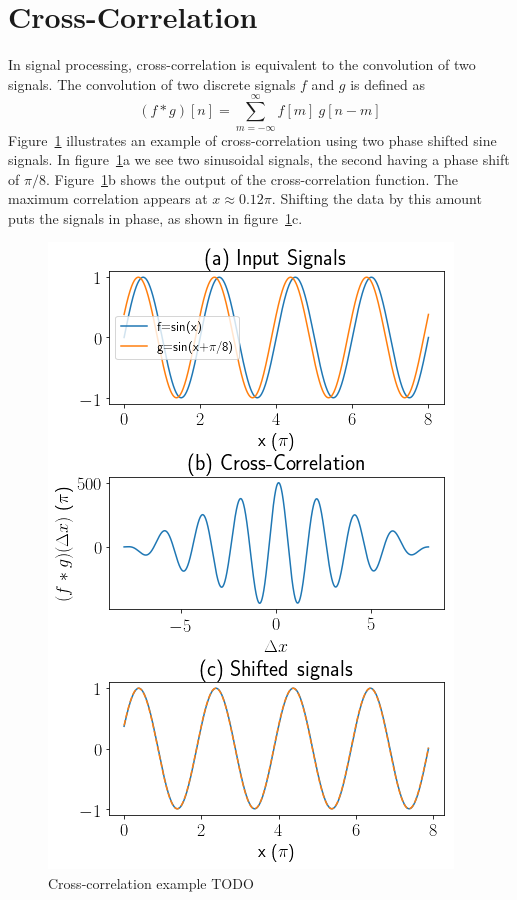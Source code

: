 \documentclass[aps,prstab,reprint,12pt]{revtex4-1}
\begin{document}
    \section{Cross-Correlation}\label{apx:correlation}
    In signal processing, cross-correlation is equivalent to the convolution of two signals. The convolution of two discrete signals $f$ and $g$ is defined as
    \begin{equation}
        (f*g)[n] = \sum\limits_{m=-\infty}^\infty f[m]\ g[n-m]
        \label{eq:convolution}
    \end{equation}
    Figure~\ref{fig:correlation_example} illustrates an example of cross-correlation using two phase shifted sine signals. In figure~\ref{fig:correlation_example}a we see two sinusoidal signals, the second having a phase shift of $\pi/8$. Figure~\ref{fig:correlation_example}b shows the output of the cross-correlation function. The maximum correlation appears at $x\approx0.12\pi$. Shifting the data by this amount puts the signals in phase, as shown in figure~\ref{fig:correlation_example}c. 

    \begin{figure}[t]
        \centering
        \includegraphics[width=0.95\linewidth]{figs/data/correlation_example.png}
        \caption{Cross-correlation example TODO}
        \label{fig:correlation_example}
    \end{figure}
\end{document}
